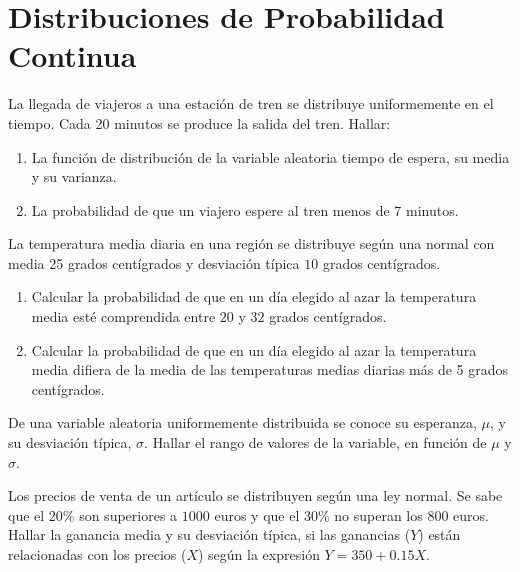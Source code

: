 \section{Distribuciones de Probabilidad Continua}


\begin{ejercicio}
    La llegada de viajeros a una estación de tren se distribuye uniformemente en el tiempo. Cada 20 minutos se produce la salida del tren. Hallar:
    \begin{enumerate}
        \item La función de distribución de la variable aleatoria tiempo de espera, su media y su varianza.
        \item La probabilidad de que un viajero espere al tren menos de 7 minutos.
    \end{enumerate}
\end{ejercicio}

\begin{ejercicio}
    La temperatura media diaria en una región se distribuye según una normal con media 25 grados centígrados y desviación típica $10$ grados centígrados.
    \begin{enumerate}
        \item Calcular la probabilidad de que en un día elegido al azar la temperatura media esté comprendida entre $20$ y $32$ grados centígrados.
        \item Calcular la probabilidad de que en un día elegido al azar la temperatura media difiera de la media de las temperaturas medias diarias más de 5 grados centígrados.
    \end{enumerate}
\end{ejercicio}

\begin{ejercicio}
    De una variable aleatoria uniformemente distribuida se conoce su esperanza, $\mu$, y su desviación típica, $\sigma$. Hallar el rango de valores de la variable, en función de $\mu$ y $\sigma$.
\end{ejercicio}

\begin{ejercicio}
    Los precios de venta de un artículo se distribuyen según una ley normal. Se sabe que el $20\%$ son superiores a $1000$ euros y que el $30\%$ no superan los $800$ euros. Hallar la ganancia media y su desviación típica, si las ganancias ($Y$) están relacionadas con los precios ($X$) según la expresión $Y = 350+0.15X$.
\end{ejercicio}


